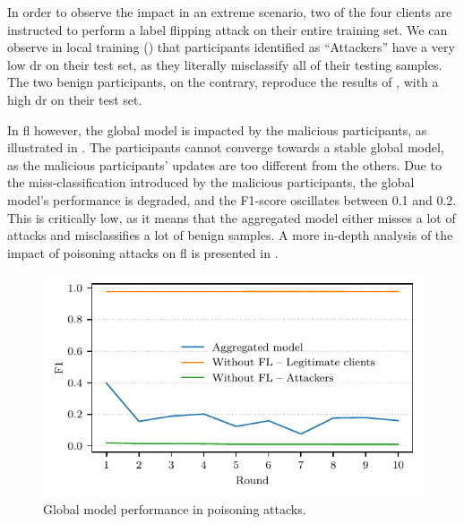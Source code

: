 In order to observe the impact in an extreme scenario, two of the four clients are instructed to perform a label flipping attack on their entire training set.
We can observe in local training () that participants identified as ``Attackers'' have a very low \gls{dr} on their test set, as they literally misclassify all of their testing samples.
The two benign participants, on the contrary, reproduce the results of , with a high \gls{dr} on their test set.

In \gls{fl} however, the global model is impacted by the malicious participants, as illustrated in .
The participants cannot converge towards a stable global model, as the malicious participants' updates are too different from the others.
Due to the miss-classification introduced by the malicious participants, the global model's performance is degraded, and the F1-score oscillates between 0.1 and 0.2.
This is critically low, as it means that the aggregated model either misses a lot of attacks and misclassifies a lot of benign samples.
A more in-depth analysis of the impact of poisoning attacks on \gls{fl} is presented in .

\begin{figure}
    \centering
    \includegraphics{figures/poisoning.pdf}
    \caption{Global model performance in poisoning attacks.}
    \label{fig:poisoning}
\end{figure}
